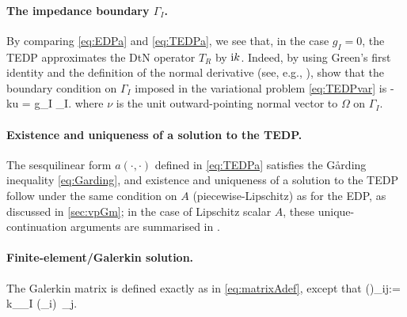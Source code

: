 %    
%

\paragraph{The impedance boundary $\Gamma_I$.} By comparing \cref{eq:EDPa} and \cref{eq:TEDPa}, we see that, in the case $g_I=0$, the TEDP approximates the DtN operator $T_R$ by $\mathrm{i} k$. Indeed, by using Green's first identity and the definition of the normal derivative (see, e.g., \cite[Lemma 4.3]{Mc:00}), show that the boundary condition on $\Gamma_I$ imposed in the variational problem \cref{eq:TEDPvar} is 
\beq\label{eq:imp}
\dudnu - \ri k\gamma u = g_I \ton \Gamma_I.
\eeq
where $\nu$ is the unit outward-pointing normal vector to $\Omega$ on $\Gamma_I$.

\paragraph{Existence and uniqueness of a solution to the TEDP.} The sesquilinear form $a(\cdot,\cdot)$ defined in \cref{eq:TEDPa} satisfies the G\aa rding inequality \cref{eq:Garding}, and existence and uniqueness of a solution to the TEDP follow under the same condition on $A$ (piecewise-Lipschitz) as for the EDP, as discussed in \cref{sec:vpGm}; in the case of Lipschitz scalar $A$, these unique-continuation arguments are summarised in \cite[\S2]{GrSa:18}.

\paragraph{Finite-element/Galerkin solution.}
The Galerkin matrix is defined exactly as in \cref{eq:matrixAdef}, except that 
\beq\label{eq:NTEDP}
\big(\Nmat\big)_{ij}:= \ri k\int_{\Gamma_I}  (\gamma\phi_i) \,\gamma \phi_j.
\eeq

